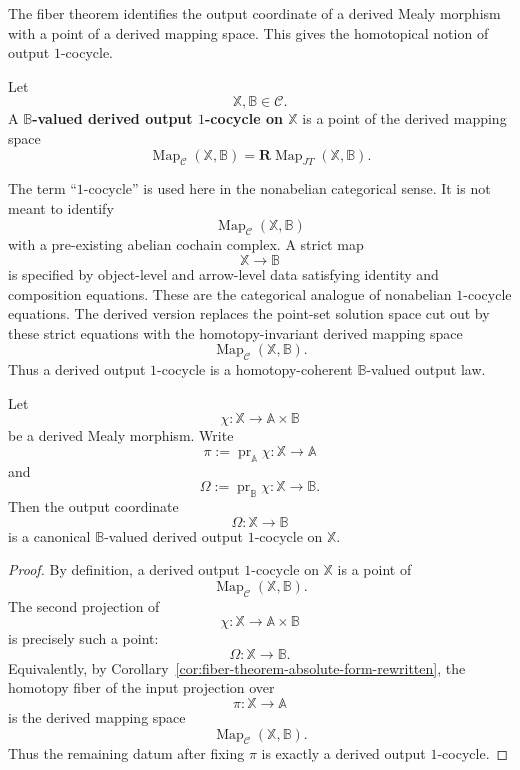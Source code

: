 The fiber theorem identifies the output coordinate of a derived Mealy
morphism with a point of a derived mapping space. This gives the
homotopical notion of output \(1\)-cocycle.

\begin{definition}
\label{def:derived-output-one-cocycle-rewritten}
Let
\[
\mathbb X,\mathbb B\in\mathcal C.
\]
A \textbf{\(\mathbb B\)-valued derived output \(1\)-cocycle on
\(\mathbb X\)} is a point of the derived mapping space
\[
\operatorname{Map}_{\mathcal C}(\mathbb X,\mathbb B)
=
\mathbf R\!\operatorname{Map}_{JT}(\mathbb X,\mathbb B).
\]
\end{definition}

\begin{remark}[Terminology]
\label{rem:one-cocycle-terminology}
The term ``\(1\)-cocycle'' is used here in the nonabelian categorical
sense. It is not meant to identify
\[
\operatorname{Map}_{\mathcal C}(\mathbb X,\mathbb B)
\]
with a pre-existing abelian cochain complex. A strict map
\[
\mathbb X\to\mathbb B
\]
is specified by object-level and arrow-level data satisfying identity
and composition equations. These are the categorical analogue of
nonabelian \(1\)-cocycle equations. The derived version replaces the
point-set solution space cut out by these strict equations with the
homotopy-invariant derived mapping space
\[
\operatorname{Map}_{\mathcal C}(\mathbb X,\mathbb B).
\]
Thus a derived output \(1\)-cocycle is a homotopy-coherent
\(\mathbb B\)-valued output law.
\end{remark}

\begin{corollary}
\label{cor:derived-outputs-are-one-cocycles-rewritten}
Let
\[
\chi:\mathbb X\to\mathbb A\times\mathbb B
\]
be a derived Mealy morphism. Write
\[
\pi:=\operatorname{pr}_{\mathbb A}\chi:\mathbb X\to\mathbb A
\]
and
\[
\Omega:=\operatorname{pr}_{\mathbb B}\chi:\mathbb X\to\mathbb B.
\]
Then the output coordinate
\[
\Omega:\mathbb X\to\mathbb B
\]
is a canonical \(\mathbb B\)-valued derived output \(1\)-cocycle on
\(\mathbb X\).
\end{corollary}

\begin{proof}
By definition, a derived output \(1\)-cocycle on \(\mathbb X\) is a point
of
\[
\operatorname{Map}_{\mathcal C}(\mathbb X,\mathbb B).
\]
The second projection of
\[
\chi:\mathbb X\to\mathbb A\times\mathbb B
\]
is precisely such a point:
\[
\Omega:\mathbb X\to\mathbb B.
\]
Equivalently, by Corollary~\ref{cor:fiber-theorem-absolute-form-rewritten},
the homotopy fiber of the input projection over
\[
\pi:\mathbb X\to\mathbb A
\]
is the derived mapping space
\[
\operatorname{Map}_{\mathcal C}(\mathbb X,\mathbb B).
\]
Thus the remaining datum after fixing \(\pi\) is exactly a derived
output \(1\)-cocycle.
\end{proof}

